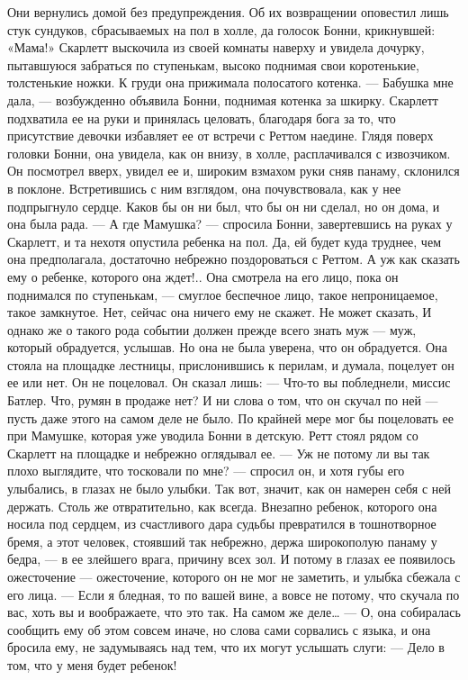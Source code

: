 Они вернулись домой без предупреждения. Об их возвращении оповестил лишь стук сундуков, сбрасываемых на пол в холле, да голосок Бонни, крикнувшей: «Мама!» Скарлетт выскочила из своей комнаты наверху и увидела дочурку, пытавшуюся забраться по ступенькам, высоко поднимая свои коротенькие, толстенькие ножки. К груди она прижимала полосатого котенка.
— Бабушка мне дала, — возбужденно объявила Бонни, поднимая котенка за шкирку.
Скарлетт подхватила ее на руки и принялась целовать, благодаря бога за то, что присутствие девочки избавляет ее от встречи с Реттом наедине. Глядя поверх головки Бонни, она увидела, как он внизу, в холле, расплачивался с извозчиком. Он посмотрел вверх, увидел ее и, широким взмахом руки сняв панаму, склонился в поклоне. Встретившись с ним взглядом, она почувствовала, как у нее подпрыгнуло сердце. Каков бы он ни был, что бы он ни сделал, но он дома, и она была рада.
— А где Мамушка? — спросила Бонни, завертевшись на руках у Скарлетт, и та нехотя опустила ребенка на пол.
Да, ей будет куда труднее, чем она предполагала, достаточно небрежно поздороваться с Реттом. А уж как сказать ему о ребенке, которого она ждет!.. Она смотрела на его лицо, пока он поднимался по ступенькам, — смуглое беспечное лицо, такое непроницаемое, такое замкнутое. Нет, сейчас она ничего ему не скажет. Не может сказать, И однако же о такого рода событии должен прежде всего знать муж — муж, который обрадуется, услышав. Но она не была уверена, что он обрадуется.
Она стояла на площадке лестницы, прислонившись к перилам, и думала, поцелует он ее или нет. Он не поцеловал. Он сказал лишь:
— Что-то вы побледнели, миссис Батлер. Что, румян в продаже нет?
И ни слова о том, что он скучал по ней — пусть даже этого на самом деле не было. По крайней мере мог бы поцеловать ее при Мамушке, которая уже уводила Бонни в детскую. Ретт стоял рядом со Скарлетт на площадке и небрежно оглядывал ее.
— Уж не потому ли вы так плохо выглядите, что тосковали по мне? — спросил он, и хотя губы его улыбались, в глазах не было улыбки.
Так вот, значит, как он намерен себя с ней держать. Столь же отвратительно, как всегда. Внезапно ребенок, которого она носила под сердцем, из счастливого дара судьбы превратился в тошнотворное бремя, а этот человек, стоявший так небрежно, держа широкополую панаму у бедра, — в ее злейшего врага, причину всех зол. И потому в глазах ее появилось ожесточение — ожесточение, которого он не мог не заметить, и улыбка сбежала с его лица.
— Если я бледная, то по вашей вине, а вовсе не потому, что скучала по вас, хоть вы и воображаете, что это так. На самом же деле… — О, она собиралась сообщить ему об этом совсем иначе, но слова сами сорвались с языка, и она бросила ему, не задумываясь над тем, что их могут услышать слуги: — Дело в том, что у меня будет ребенок!
